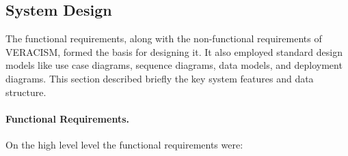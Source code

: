 \clearpage

\subsection{System Design}

The functional requirements, along with the non-functional requirements of VERACISM, formed the basis for designing it. It also employed standard design models like use case diagrams, sequence diagrams, data models, and deployment diagrams. This section described briefly the key system features and data structure.

\paragraph{Functional Requirements.}
On the high level level the functional requirements were:

